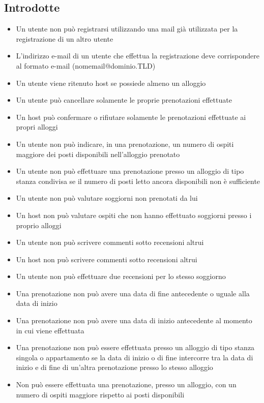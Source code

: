 \subsection{Introdotte}
\begin{itemize}
  \item Un utente non può registrarsi utilizzando una mail già utilizzata per la registrazione di un altro utente
  \item L'indirizzo e-mail di un utente che effettua la registrazione deve corrispondere al formato e-mail (nomemail@dominio.TLD)
  \item Un utente viene ritenuto host se possiede almeno un alloggio
  \item Un utente può cancellare solamente le proprie prenotazioni effettuate
  \item Un host può confermare o rifiutare solamente le prenotazioni effettuate ai propri alloggi
  \item Un utente non può indicare, in una prenotazione, un numero di ospiti maggiore dei posti disponibili nell'alloggio prenotato
  \item Un utente non può effettuare una prenotazione presso un alloggio di tipo stanza condivisa se il numero di posti letto ancora disponibili non è sufficiente
  \item Un utente non può valutare soggiorni non prenotati da lui
  \item Un host non può valutare ospiti che non hanno effettuato soggiorni presso i proprio alloggi
  \item Un utente non può scrivere commenti sotto recensioni altrui
  \item Un host non può scrivere commenti sotto recensioni altrui
  \item Un utente non può effettuare due recensioni per lo stesso soggiorno
  \item Una prenotazione non può avere una data di fine antecedente o uguale alla data di inizio
  \item Una prenotazione non può avere una data di inizio antecedente al momento in cui viene effettuata
  \item Una prenotazione non può essere effettuata presso un alloggio di tipo stanza singola o appartamento se la data di inizio o di fine intercorre tra la data di inizio e di fine di un'altra prenotazione presso lo stesso alloggio
  \item Non può essere effettuata una prenotazione, presso un alloggio, con un numero di ospiti maggiore rispetto ai posti disponibili
\end{itemize}